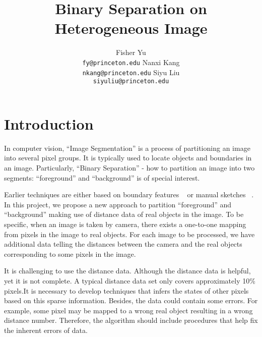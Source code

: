 \documentclass{article} %
\title{Binary Separation on Heterogeneous Image}
\author{
Fisher Yu \\
\texttt{fy@princeton.edu}
\And
Nanxi Kang \\
\texttt{nkang@princeton.edu} 
\And
Siyu Liu\\
\texttt{siyuliu@princeton.edu}
}
\begin{document}
\maketitle


\section{Introduction}

In computer vision, ``Image Segmentation'' is a process of partitioning an
image into several pixel groups. It is typically used to locate
objects and boundaries in an image. Particularly, ``Binary Separation'' -
how to partition an image into two segments: ``foreground''
 and ``background'' is of special interest. 


Earlier techniques are either based on boundary features
~\citep{Kass1988snakes} or manual sketches
~\citep{Boykov2006graph}. In this project, we propose a new
approach to partition ``foreground'' and ``background'' making use of 
distance data of real objects in the image. To be specific, when an
image is taken by camera, there exists a
one-to-one mapping from pixels in the image to real objects. 
For each image to be processed, we have additional data telling the 
distances between the camera and the real objects corresponding to some
 pixels in the image. 

It is challenging to use the distance data. Although the distance data
is helpful, yet it is not complete. A typical distance data set only
covers approximately 10\% pixels.It is necessary to develop techniques
that infers the states of other pixels based on this sparse
information. Besides, the data could contain some errors. For example,
some pixel may be mapped to a wrong real object resulting in a wrong
distance number. Therefore, the algorithm should include procedures
that help fix the inherent errors of data. 
\end{document}
